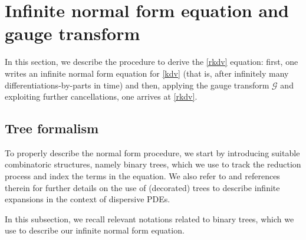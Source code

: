\documentclass[a4paper,
11pt,  reqno]{amsart}
\newcommand{\5}{\textup{V}}
\theoremstyle{remark}
\newcommand{\Gc}{\mathcal{G}}
\numberwithin{equation}{section}
\numberwithin{theorem}{section}
\begin{document}
\section{Infinite normal form equation and gauge transform}\label{sec:infr}


In this section, we describe the procedure to derive the \eqref{rkdv} equation:
first, one writes an infinite normal form equation for \eqref{kdv} (that is, after infinitely
many differentiations-by-parts in time) and then, applying the gauge transform $\Gc$ and exploiting further cancellations, one arrives at \eqref{rkdv}.




\subsection{Tree formalism}
\label{SUB:tree}


To properly describe the normal form procedure, we start by introducing suitable combinatoric structures, namely  binary trees, which we use to track the reduction process and index the terms in the equation.
We also refer to \cite{Bruned, Christ_power, GuoKwonOh_nls,kishimoto, KOY20} and references therein for further details on the use of (decorated) trees to describe infinite expansions in the context of dispersive PDEs.

In this subsection, we recall relevant notations related to binary trees, which we use to describe our infinite normal form equation.
\end{document}
